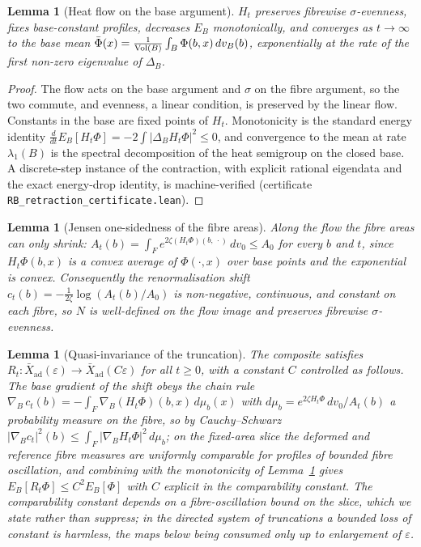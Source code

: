 \documentclass[11pt]{article}
\numberwithin{equation}{section}
\theoremstyle{plain}
\newtheorem{lemma}[theorem]{Lemma}
\theoremstyle{definition}
\theoremstyle{remark}
\newcommand{\Xbad}{\bar{X}_{\mathrm{ad}}}
\begin{document}
\begin{lemma}[Heat flow on the base argument]\label{rb:heat}
$H_{t}$ preserves fibrewise $\sigma$-evenness, fixes base-constant
profiles, decreases $E_{B}$ monotonically, and converges as
$t \to \infty$ to the base mean
$\bar\Phi(x) = \textstyle\frac{1}{\mathrm{Vol}(B)}\int_{B}\Phi(b, x)\,dv_{B}(b)$, exponentially at
the rate of the first non-zero eigenvalue of $\Delta_{B}$.
\end{lemma}

\begin{proof}
The flow acts on the base argument and $\sigma$ on the fibre
argument, so the two commute, and evenness, a linear condition, is
preserved by the linear flow. Constants in the base are fixed
points of $H_{t}$. Monotonicity is the standard energy identity
$\tfrac{d}{dt}E_{B}[H_{t}\Phi] = -2\!\int|\Delta_{B}H_{t}\Phi|^{2}
\leq 0$, and convergence to the mean at rate $\lambda_{1}(B)$ is
the spectral decomposition of the heat semigroup on the closed
base. A discrete-step instance of the contraction, with explicit
rational eigendata and the exact energy-drop identity, is
machine-verified (certificate
\texttt{RB\_retraction\_certificate.lean}).
\end{proof}

\begin{lemma}[Jensen one-sidedness of the fibre
areas]\label{rb:jensen}
Along the flow the fibre areas can only shrink:
$A_{t}(b) = \int_{F} e^{2\zeta(H_{t}\Phi)(b,\,\cdot)}\,dv_{0} \leq
A_{0}$ for every $b$ and $t$, since $H_{t}\Phi(b, x)$ is a convex
average of $\Phi(\cdot, x)$ over base points and the exponential is
convex. Consequently the renormalisation shift
$c_{t}(b) = -\tfrac{1}{2\zeta}\log(A_{t}(b)/A_{0})$ is
non-negative, continuous, and constant on each fibre, so $N$ is
well-defined on the flow image and preserves fibrewise
$\sigma$-evenness.
\end{lemma}

\begin{lemma}[Quasi-invariance of the truncation]\label{rb:quasi}
The composite satisfies
$R_{t} : \Xbad(\varepsilon) \to \Xbad(C\varepsilon)$ for all
$t \geq 0$, with a constant $C$ controlled as follows. The base
gradient of the shift obeys the chain rule
$\nabla_{\!B}\, c_{t}(b) = -\!\int_{F}
\nabla_{\!B}(H_{t}\Phi)(b, x)\, d\mu_{b}(x)$ with
$d\mu_{b} = e^{2\zeta H_{t}\Phi}\,dv_{0}/A_{t}(b)$ a probability
measure on the fibre, so by Cauchy--Schwarz
$|\nabla_{\!B}c_{t}|^{2}(b) \leq \int_{F}
|\nabla_{\!B}H_{t}\Phi|^{2}\,d\mu_{b}$; on the fixed-area slice the
deformed and reference fibre measures are uniformly comparable for
profiles of bounded fibre oscillation, and combining with the
monotonicity of Lemma~\ref{rb:heat} gives
$E_{B}[R_{t}\Phi] \leq C^{2} E_{B}[\Phi]$ with $C$ explicit in the
comparability constant. The comparability constant depends on a
fibre-oscillation bound on the slice, which we state rather than
suppress; in the directed system of truncations a bounded loss of
constant is harmless, the maps below being consumed only up to
enlargement of $\varepsilon$.
\end{lemma}
\end{document}

